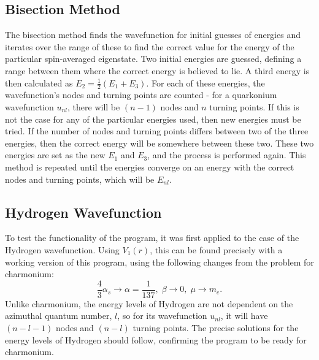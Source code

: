 \documentclass[10pt, twocolumn]{article}
\begin{document}
\subsection{Bisection Method}
The bisection method finds the wavefunction for initial guesses of energies and iterates over the range of these to find the correct value for the energy of the particular spin-averaged eigenstate.
Two initial energies are guessed, defining a range between them where the correct energy is believed to lie.
A third energy is then calculated as $E_2 = \frac12 (E_1+E_3)$.
For each of these energies, the wavefunction's nodes and turning points are counted - for a quarkonium wavefunction $u_{nl}$, there will be $(n-1)$ nodes and $n$ turning points.
If this is not the case for any of the particular energies used, then new energies must be tried. 
If the number of nodes and turning points differs between two of the three energies, then the correct energy will be somewhere between these two. 
These two energies are set as the new $E_1$ and $E_3$, and the process is performed again.
This method is repeated until the energies converge on an energy with the correct nodes and turning points, which will be $E_{nl}$.

\subsection{Hydrogen Wavefunction}
To test the functionality of the program, it was first applied to the case of the Hydrogen wavefunction. 
Using $V_1(r)$, this can be found precisely with a working version of this program, using the following changes from the problem for charmonium:
\begin{equation}
    \frac43 \alpha_s \to \alpha=\frac{1}{137},\; \beta \to 0,\; \mu \to m_e.
\end{equation}
Unlike charmonium, the energy levels of Hydrogen are not dependent on the azimuthal quantum number, $l$, so for its wavefunction $u_{nl}$, it will have $(n-l-1)$ nodes and $(n-l)$ turning points.
The precise solutions for the energy levels of Hydrogen should follow, confirming the program to be ready for charmonium.
\end{document}
